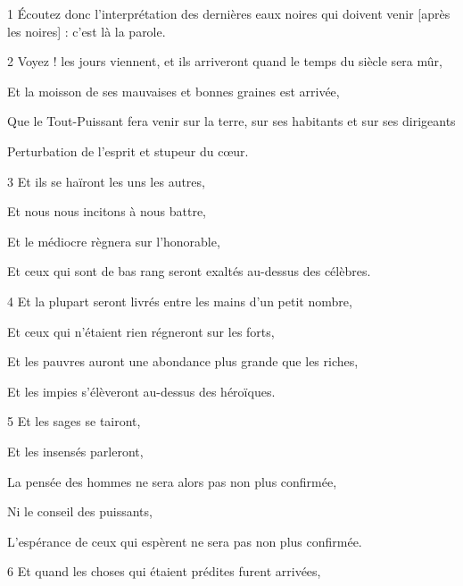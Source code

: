 \par 1 Écoutez donc l'interprétation des dernières eaux noires qui doivent venir [après les noires] : c'est là la parole.

\par 2 Voyez ! les jours viennent, et ils arriveront quand le temps du siècle sera mûr,

\par Et la moisson de ses mauvaises et bonnes graines est arrivée,

\par Que le Tout-Puissant fera venir sur la terre, sur ses habitants et sur ses dirigeants

\par Perturbation de l'esprit et stupeur du cœur.

\par 3 Et ils se haïront les uns les autres,

\par Et nous nous incitons à nous battre,

\par Et le médiocre règnera sur l'honorable,

\par Et ceux qui sont de bas rang seront exaltés au-dessus des célèbres.

\par 4 Et la plupart seront livrés entre les mains d'un petit nombre,

\par Et ceux qui n'étaient rien régneront sur les forts,

\par Et les pauvres auront une abondance plus grande que les riches,

\par Et les impies s'élèveront au-dessus des héroïques.

\par 5 Et les sages se tairont,

\par Et les insensés parleront,

\par La pensée des hommes ne sera alors pas non plus confirmée,

\par Ni le conseil des puissants,

\par L'espérance de ceux qui espèrent ne sera pas non plus confirmée.

\par 6 Et quand les choses qui étaient prédites furent arrivées,

